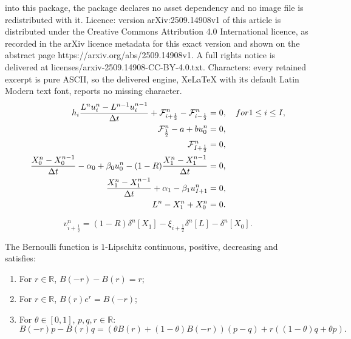 \documentclass[10pt,a4paper]{amsart}
\newcommand\Fluxnum[1]{\mathcal{F}_{#1 \frac{1}{2}}^n}
\newcommand\R{\mathbb{R}}
\newcommand\dt{\Delta t}
\renewcommand\v[2]{v_{#1 \frac{1}{2}}^{#2}}
\begin{document}
into this package, the package declares no asset dependency and no image file is redistributed with it. Licence: version arXiv:2509.14908v1 of this article is distributed under the Creative Commons Attribution 4.0 International licence, as recorded in the arXiv licence metadata for this exact version and shown on the abstract page https://arxiv.org/abs/2509.14908v1. A full rights notice is delivered at licenses/arxiv-2509.14908-CC-BY-4.0.txt. Characters: every retained excerpt is pure ASCII, so the delivered engine, XeLaTeX with its default Latin Modern text font, reports no missing character.
\begin{subequations} \label{eq:scheme}
\begin{align}
	\label{eq:scheme_u}
		h_i \frac{L^n u_i^n - L^{n-1} u_i^{n-1}}{\dt} + \Fluxnum{i+} - \Fluxnum{i-} &= 0, \quad \textnormal{ for } 1 \leq i \leq I, \\
	\label{eq:left_cond_flux}
		\Fluxnum{} - a + bu_0^n &= 0, \\
	\label{eq:right_cond_flux}
		\Fluxnum{I+} &= 0, \\
	\label{eq:X0}
	\frac{X_0^n - X_0^{n-1}}{\dt} - \alpha_0 + \beta_0 u_0^{n} - (1-R) \frac{X_1^n - X_1^{n-1}}{\dt} &= 0, \\
	\label{eq:X1}
		\frac{X_1^n - X_1^{n-1}}{\dt} + \alpha_1 - \beta_1 u_{I+1}^{n} &= 0, \\
		L^n - X_1^n + X_0^n &= 0.\label{eq:L}
\end{align}
\end{subequations}

	\begin{equation}
	    \label{eq:def_v}
		\v{i+}{n} = (1-R) \delta^n [X_1] - \xi_{i+\frac{1}{2}} \delta^n [L] - \delta^n [X_0].
	\end{equation} 

	\begin{lemma} \label{lem:Bern}
		The Bernoulli function is $1$-Lipschitz continuous, positive, decreasing and satisfies:
		\begin{enumerate}[label=(\textit{\roman*})]
			\item For $r \in \R$, $B(-r) - B(r) = r$;
			\item For $r \in \R$, $B(r)e^r = B(-r)$;
			\item For $\theta \in [0,1]$, $p,q,r \in \R$:
				\begin{equation} \label{eq:Bern}
					B(-r)p - B(r)q = (\theta B(r) + (1-\theta) B(-r))(p-q) + r((1-\theta)q + \theta p).
				\end{equation}
		\end{enumerate}
	\end{lemma}
\end{document}
